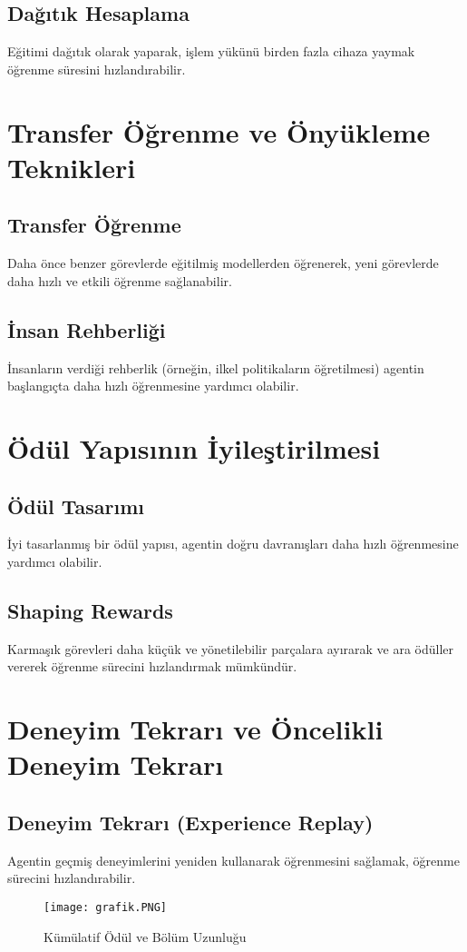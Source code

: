 \documentclass{article}
\begin{document}
\subsection{Dağıtık Hesaplama}
Eğitimi dağıtık olarak yaparak, işlem yükünü birden fazla cihaza yaymak öğrenme süresini hızlandırabilir.

\section{Transfer Öğrenme ve Önyükleme Teknikleri}
\subsection{Transfer Öğrenme}
Daha önce benzer görevlerde eğitilmiş modellerden öğrenerek, yeni görevlerde daha hızlı ve etkili öğrenme sağlanabilir.

\subsection{İnsan Rehberliği}
İnsanların verdiği rehberlik (örneğin, ilkel politikaların öğretilmesi) agentin başlangıçta daha hızlı öğrenmesine yardımcı olabilir.

\section{Ödül Yapısının İyileştirilmesi}
\subsection{Ödül Tasarımı}
İyi tasarlanmış bir ödül yapısı, agentin doğru davranışları daha hızlı öğrenmesine yardımcı olabilir.

\subsection{Shaping Rewards}
Karmaşık görevleri daha küçük ve yönetilebilir parçalara ayırarak ve ara ödüller vererek öğrenme sürecini hızlandırmak mümkündür.
\newpage
\section{Deneyim Tekrarı ve Öncelikli Deneyim Tekrarı}
\subsection{Deneyim Tekrarı (Experience Replay)}
Agentin geçmiş deneyimlerini yeniden kullanarak öğrenmesini sağlamak, öğrenme sürecini hızlandırabilir.
\begin{figure}[h]
    \centering
    \texttt{[image: grafik.PNG]}
    \caption{Kümülatif Ödül ve Bölüm Uzunluğu}
    \label{fig:resim28}
    \end{figure}
\end{document}
